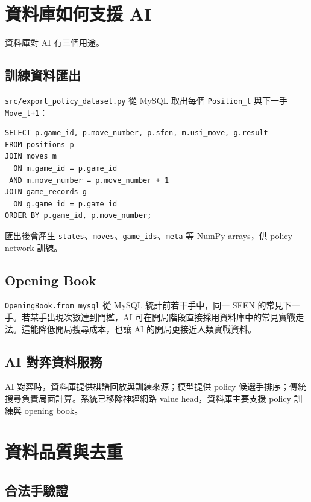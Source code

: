 \documentclass[12pt,a4paper,fontset=none]{ctexart}
\begin{document}
\section{資料庫如何支援 AI}

資料庫對 AI 有三個用途。

\subsection{訓練資料匯出}

\texttt{src/export\_policy\_dataset.py} 從 MySQL 取出每個 \texttt{Position\_t} 與下一手 \texttt{Move\_{t+1}}：

\begin{lstlisting}[style=cmd]
SELECT p.game_id, p.move_number, p.sfen, m.usi_move, g.result
FROM positions p
JOIN moves m
  ON m.game_id = p.game_id
 AND m.move_number = p.move_number + 1
JOIN game_records g
  ON g.game_id = p.game_id
ORDER BY p.game_id, p.move_number;
\end{lstlisting}

匯出後會產生 \texttt{states}、\texttt{moves}、\texttt{game\_ids}、\texttt{meta} 等 NumPy arrays，供 policy network 訓練。

\subsection{Opening Book}

\texttt{OpeningBook.from\_mysql} 從 MySQL 統計前若干手中，同一 SFEN 的常見下一手。若某手出現次數達到門檻，AI 可在開局階段直接採用資料庫中的常見實戰走法。這能降低開局搜尋成本，也讓 AI 的開局更接近人類實戰資料。

\subsection{AI 對弈資料服務}

AI 對弈時，資料庫提供棋譜回放與訓練來源；模型提供 policy 候選手排序；傳統搜尋負責局面計算。系統已移除神經網路 value head，資料庫主要支援 policy 訓練與 opening book。

\section{資料品質與去重}

\subsection{合法手驗證}
\end{document}

